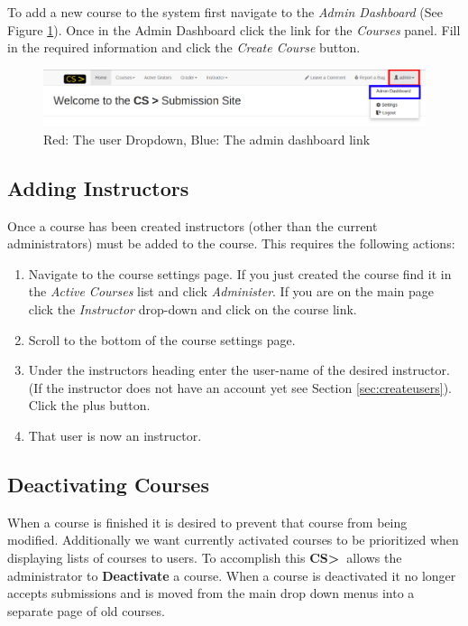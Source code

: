 \documentclass[11pt]{report}
\newcommand{\csgt}[0]{\textbf{CS\textgreater\ }}
\begin{document}
To add a new course to the system first navigate to the \emph{Admin Dashboard} (See Figure \ref{fig:admindash}).
Once in the Admin Dashboard click the link for the \emph{Courses} panel. Fill in the required information and
click the \emph{Create Course} button.

\begin{figure}
\centering
\includegraphics[width=\textwidth,height=\textheight,keepaspectratio]{diagrams/admin_header}
\caption{Red: The user Dropdown, Blue: The admin dashboard link}
\label{fig:admindash}
\end{figure}

\subsection{Adding Instructors}
Once a course has been created instructors (other than the current administrators) must be added to the course.
This requires the following actions:
\begin{enumerate}
\item Navigate to the course settings page. If you just created the course find it in the \emph{Active Courses}
list and click \emph{Administer}. If you are on the main page click the \emph{Instructor} drop-down and click on
the course link.
\item Scroll to the bottom of the course settings page.
\item Under the instructors heading enter the user-name of the desired instructor. (If the instructor does not have an account yet see Section \ref{sec:createusers}). Click the plus button.
\item That user is now an instructor.
\end{enumerate}

\subsection{Deactivating Courses}
When a course is finished it is desired to prevent that course from being modified. Additionally we want
currently activated courses to be prioritized when displaying lists of courses to users.
To accomplish this \csgt allows the administrator to \textbf{Deactivate} a course. When a course is deactivated
it no longer accepts submissions and is moved from the main drop down menus into a separate page of old courses.
\end{document}
